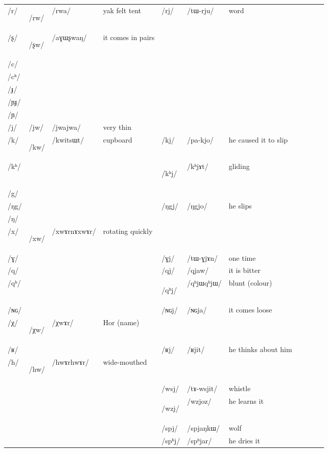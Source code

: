 \documentclass[oneside,a4paper,11pt]{article}
\newcommand{\ipa}[1]{\mbox{\phon/#1/}}
\newcommand{\deux}[1]{\ipa{#1}\addtocounter{2clusters}{1}}
\newcommand{\trois}[1]{\ipa{#1}\addtocounter{3clusters}{1}}
\newcommand{\tib}[1]{\cellcolor{lightgray}\textbf{#1}}
\newcommand{\idph}[1]{\cellcolor{gray}\textbf{#1}}
\begin{document}
\begin{table}
{\begin{tabular}{l|lll|lll|lll|l}
\ipa{r} 	&\deux{rw}\tib{} 	&\ipa{rwa} 	&yak felt tent	&\deux{rj} 	&\ipa{tɯ-rju} 	&word \\	
\ipa{ʂ} 	&\deux{ʂw} \tib{}	&\ipa{aɣɯʂwaŋ} 	&it comes in pairs	& 	& 	&\\	
\ipa{c} 	& 	& 	&	& 	& 	&\\	
\ipa{cʰ} 	& 	& 	&	& 	& 	&\\	
\ipa{ɟ} 	& 	& 	&	& 	& 	&\\	
\ipa{ɲɟ} 	& 	& 	&	& 	& 	&\\	
\ipa{ɲ} 	& 	& 	&	& 	& 	&\\	
\ipa{j} 	&\deux{jw} 	&\ipa{jwajwa} 	&very thin	& 	& 	&\\	
\ipa{k} 	&\deux{kw}\tib{} 	&\ipa{kwitsɯt} 	&cupboard	&\deux{kj} 	&\ipa{pa-kjo} 	&he caused it to slip\\	
\ipa{kʰ} 	&  	& 	&	&  	\deux{kʰj} \idph{}& \ipa{kʰjɤt} 	& gliding\\	
\ipa{g} 	& 	& 	&	& 	& 	&\\	
\ipa{ŋg} 	& 	& 	&	&\deux{ŋgj} 	&\ipa{ŋgjo} 	&he slips\\	
\ipa{ŋ} 	& 	& 	&	& 	& 	&\\	
\ipa{x} 	&\deux{xw}\idph{} 	& 	\ipa{xwɤrnɤxwɤr}& rotating quickly	& 	& 	&\\	
\ipa{ɣ} 	& 	& 	&	&\deux{ɣj} 	&\ipa{tɯ-ɣjɤn} 	&one time\\	
\ipa{q} 	& 	& 	&	&\deux{qj} 	&\ipa{qjaw} 	&it is bitter\\	
\ipa{qʰ} 	& 	& 	&	&\deux{qʰj} \idph{}	&\ipa{qʰjɯqʰjɯ} 	&blunt (colour)\\	
\ipa{ɴɢ} 	& 	& 	&	&\deux{ɴɢj} 	&\ipa{ɴɢja} 	&it comes loose\\	
\ipa{χ} 	&\deux{χw} \tib{}	&\ipa{χwɤr} 	&Hor (name)	& 	& 	&\\	
\ipa{ʁ} 	& 	& 	&	&\deux{ʁj} 	&\ipa{ʁjit} 	&he thinks about 	
him\\
\ipa{h} 	&\deux{hw} \idph{}	&\ipa{hwɤrhwɤr} 	&wide-mouthed	& 	& 	&\\	
\midrule
 		& 		&		&		&\trois{wsj} 		&\ipa{tɤ-wsjit} 		&whistle\\
 		& 		&		&		&\trois{wzj}  \tib{}		&\ipa{wzjoz}  		&he learns it\\
\midrule												
 		& 		&		&		&\trois{spj} 		&\ipa{spjaŋkɯ} 		&wolf\\
 		& 		&		&		&\trois{spʰj} 		&\ipa{spʰjar} 		& he dries it\\

\end{tabular}}
\end{table}
\end{document}
